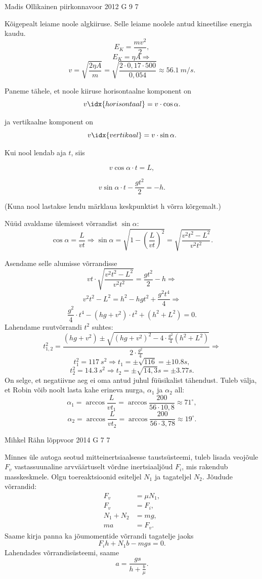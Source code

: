\documentclass[11pt, twoside]{article}
\begin{document}
{%
{Madis Ollikainen} %
{piirkonnavoor} %
{2012} %
{G 9} %
{7} %
{

\ifSolution
Kõigepealt leiame noole algkiiruse. Selle leiame noolele antud kineetilise energia kaudu.
$$ E_{K}=\frac{m v^2}{2},$$
$$E_{K}=\eta A \Rightarrow$$
$$v=\sqrt{\frac{2\eta A}{m}}=\sqrt{\frac{2\cdot0,17\cdot 500}{0,054}}\approx \SI{56,1}{m/s}.$$

Paneme tähele, et noole kiiruse horisontaalne komponent on
$$v\idx{horisontaal}=v\cdot \cos\alpha.$$

ja vertikaalne komponent on
$$v\idx{vertikaal}=v\cdot \sin\alpha.$$

Kui nool lendab aja $t$, siis 

$$v \cos\alpha\cdot t=L,$$

$$v \sin\alpha\cdot t-\frac{g t^2}{2}=-h. $$

(Kuna nool lastakse lendu märklaua keskpunktist h võrra kõrgemalt.)

Nüüd avaldame ülemisest võrrandist $\sin\alpha$:
$$\cos\alpha=\frac{L}{vt} \Rightarrow \sin\alpha=\sqrt{1-\left(\frac{L}{vt}\right)^2}=\sqrt{\frac{v^2t^2-L^2}{v^2t^2}}.$$


Asendame selle alumisse võrrandisse
$$vt\cdot \sqrt{\frac{v^2t^2-L^2}{v^2t^2}}=\frac{g t^2}{2}-h \Rightarrow$$
$$v^2t^2-L^2=h^2 - hgt^2+\frac{g^2 t^4}{4} \Rightarrow$$
$$\frac{g^2}{4}\cdot t^4 - \left(hg+v^2\right)\cdot t^2 + \left(h^2+L^2\right)=0.$$
Lahendame ruutvõrrandi $t^2$ suhtes:
$$t^2_{1,2}=\frac{\left(hg+v^2\right)\pm\sqrt{\left(hg+v^2\right)^2-4\cdot \frac{g^2}{4}\left(h^2+L^2\right)}}{2\cdot \frac{g^2}{4}} \Rightarrow$$
$$t^2_{1}=\SI{117}{s^2} \Rightarrow t_{1}=\pm\sqrt{116}=\pm \SI{10,8}s,$$
$$t^2_{2}=\SI{14,3}{s^2} \Rightarrow t_{2}=\pm \sqrt{14,3}\SI{}s=\pm \SI{3,77}s.$$
On selge, et negatiivne aeg ei oma antud juhul füüsikalist tähendust. Tuleb välja, et Robin võib noolt lasta kahe erineva nurga, 
$\alpha_{1}$ ja $\alpha_{2}$ all:
$$\alpha_{1}= \arccos\frac{L}{vt_{1}}=\arccos\frac{200}{56\cdot10,8}\approx 71^\circ ,$$
$$\alpha_{2}=\arccos\frac{L}{vt_{2}}=\arccos\frac{200}{56\cdot3,78}\approx 19^\circ .$$
\fi
}

{Mihkel Rähn} %
{lõppvoor} %
{2014} %
{G 7} %
{7} %
{

\ifSolution
Minnes üle autoga seotud mitteinertsiaalsesse taustsüsteemi, tuleb lisada veojõule $F_v$ vastassuunaline arvväärtuselt võrdne inertsiaaljõud $F_i$, mis rakendub masskeskmele. Olgu toereaktsioonid esiteljel $N_1$ ja tagateljel $N_2$. Jõudude võrrandid:
\[
\begin{aligned}
F_v&=\mu N_1,\\
F_v&=F_i,\\
N_1+N_2&=mg,\\
ma&=F_v. 
\end{aligned}
\]
Saame kirja panna ka jõumomentide võrrandi tagatelje jaoks 
\[
F_ih+N_1b-mgs=0.
\]
Lahendades võrrandisüsteemi, saame
\[
a=\frac{gs}{h+\frac{b}{\mu}}.
\]
\fi
}

}
\end{document}

